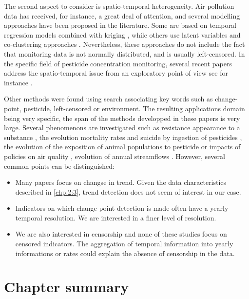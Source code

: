 The second aspect to consider is spatio-temporal heterogeneity. Air pollution data has received, for instance, a great deal of attention, and several modelling approaches have been proposed in the literature. Some are based on temporal regression models combined with kriging \cite{sampson2011,lindstrom2014flexible}, while others use latent variables and co-clustering approaches \cite{bouveyron2021co}. Nevertheless, these approaches do not include the fact that monitoring data is not normally distributed, and is usually left-censored. In the specific field of pesticide concentration monitoring, several recent papers address the spatio-temporal issue from an exploratory point of view see for instance \cite{masia2016,figueiredo2021spatio,aznar2017spatio}. 

Other methods were found using search associating key words such as change-point, pesticide, left-censored or environment. The resulting applications domain being very specific, the span of the methods developped in these papers is very large. Several phenomenons are investigated such as resistance appearance to a substance \cite{Solla2010}, the evolution mortality rates and suicide by ingestion of pesticides \cite{Ko2017}, the evolution of the exposition of animal populations to pesticide \cite{Menger2022} or impacts of policies on air quality \cite{FOMBY2006}, evolution of annual streamflows \cite{Ryberg2020}. However, several common points can be distinguished:      
\begin{itemize}
\item Many papers focus on changse in trend. Given the data characteristics described in \ref{chp:2:3}, trend detection does not seem of interest in our case.
\item Indicators on which change point detection is made often have a yearly temporal resolution. We are interested in a finer level of resolution. 
\item We are also interested in censorship and none of these studies focus on censored indicators. The aggregation of temporal information into yearly informations or rates could explain the absence of censorship in the data.   
\end{itemize}

\section{Chapter summary}

